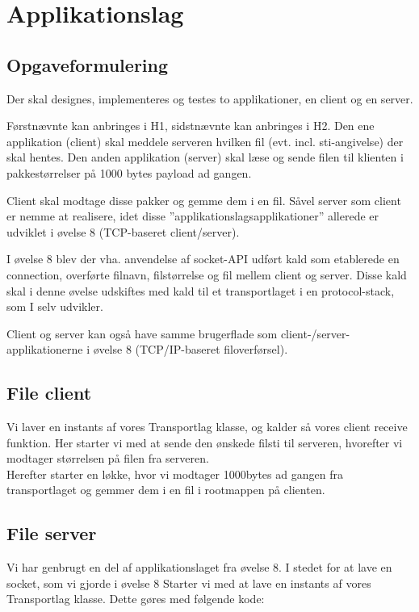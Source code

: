 \chapter{Applikationslag}

\section{Opgaveformulering}

Der skal designes, implementeres og testes to applikationer, en client og en server.

Førstnævnte kan anbringes i H1, sidstnævnte kan anbringes i H2.
Den ene applikation (client) skal meddele serveren hvilken fil (evt. incl. sti-angivelse) der skal hentes.
Den anden applikation (server) skal læse og sende filen til klienten i pakkestørrelser på 1000 bytes payload ad gangen.

Client skal modtage disse pakker og gemme dem i en fil.
Såvel server som client er nemme at realisere, idet disse ”applikationslagsapplikationer” allerede er udviklet i øvelse 8 (TCP-baseret client/server).

I øvelse 8 blev der vha. anvendelse af socket-API udført kald som etablerede en connection, overførte filnavn, filstørrelse og fil mellem client og server. Disse kald skal i denne øvelse udskiftes med kald til et transportlaget i en protocol-stack, som I selv udvikler. 

Client og server kan også have samme brugerflade som client-/server-applikationerne i øvelse 8 (TCP/IP-baseret filoverførsel).

\section{File client}
 Vi laver en instants af vores Transportlag klasse, og kalder så vores client receive funktion. Her starter vi med at sende den ønskede filsti til serveren, hvorefter vi modtager størrelsen på filen fra serveren. \\ Herefter starter en løkke, hvor vi modtager 1000bytes ad gangen fra transportlaget og gemmer dem i en fil i rootmappen på clienten.

\section{File server}

Vi har genbrugt en del af applikationslaget fra øvelse 8. I stedet for at lave en socket, som vi gjorde i øvelse 8 Starter vi med at lave en instants af vores Transportlag klasse. Dette gøres med følgende kode: 

